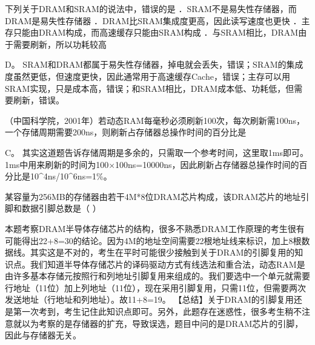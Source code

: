 \question 下列关于DRAM和SRAM的说法中，错误的是
．SRAM不是易失性存储器，而DRAM是易失性存储器
．DRAM比SRAM集成度更高，因此读写速度也更快
．主存只能由DRAM构成，而高速缓存只能由SRAM构成
．与SRAM相比，DRAM由于需要刷新，所以功耗较高
\par{}
\begin{solution}D。
SRAM和DRAM都属于易失性存储器，掉电就会丢失，错误；SRAM的集成度虽然更低，但速度更快，因此通常用于高速缓存Cache，错误；主存可以用SRAM实现，只是成本高，错误；和SRAM相比，DRAM成本低、功耗低，但需要刷新，错误。
\end{solution}
\question （中国科学院，2001年）若动态RAM每毫秒必须刷新100次，每次刷新需100ns，一个存储周期需要200ns，则刷新占存储器总操作时间的百分比是
\par{}
\begin{solution}C。
其实这道题告诉存储周期是多余的，只需取一个参考时间，这里取1ms即可。1ms中用来刷新的时间为100×100ns=10000ns，因此刷新占存储器总操作时间的百分比是10\^{}4ns/10\^{}6ns=1\%。
\end{solution}
\question 某容量为256MB的存储器由若干4M*8位DRAM芯片构成，该DRAM芯片的地址引脚和数据引脚总数是（
）
\par{}
\begin{solution}本题考察DRAM半导体存储芯片的结构，很多不熟悉DRAM工作原理的考生很有可能得出22+8=30的结论。因为4M的地址空间需要22根地址线来标识，加上8根数据线。其实这是不对的，考生在平时可能很少接触到关于DRAM的引脚复用的知识点。我们知道半导体存储芯片的译码驱动方式有线选法和重合法，动态RAM是由许多基本存储元按照行和列地址引脚复用来组成的。我们要选中一个单元就需要行地址（11位）加上列地址（11位），现在采用引脚复用，只需11位，但需要两次发送地址（行地址和列地址）。故11+8=19。
【总结】关于DRAM的引脚复用还是第一次考到，考生记住此知识点即可。另外，此题存在迷惑性，很多考生稍不注意就以为考察的是存储器的扩充，导致误选，题目中问的是DRAM芯片的引脚，因此与存储器无关。
\end{solution}
